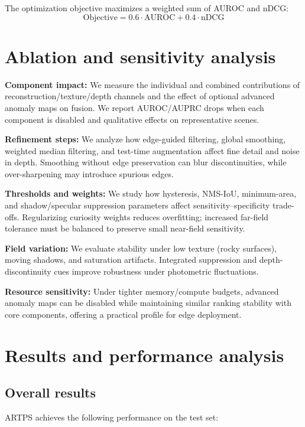 \documentclass[12pt]{article}
\begin{document}
The optimization objective maximizes a weighted sum of AUROC and nDCG:
\[ \text{Objective} = 0.6 \cdot \text{AUROC} + 0.4 \cdot \text{nDCG} \]

\section{Ablation and sensitivity analysis}
\textbf{Component impact:} We measure the individual and combined contributions of reconstruction/texture/depth channels and the effect of optional advanced anomaly maps on fusion. We report AUROC/AUPRC drops when each component is disabled and qualitative effects on representative scenes.

\textbf{Refinement steps:} We analyze how edge-guided filtering, global smoothing, weighted median filtering, and test-time augmentation affect fine detail and noise in depth. Smoothing without edge preservation can blur discontinuities, while over-sharpening may introduce spurious edges.

\textbf{Thresholds and weights:} We study how hysteresis, NMS-IoU, minimum-area, and shadow/specular suppression parameters affect sensitivity--specificity trade-offs. Regularizing curiosity weights reduces overfitting; increased far-field tolerance must be balanced to preserve small near-field sensitivity.

\textbf{Field variation:} We evaluate stability under low texture (rocky surfaces), moving shadows, and saturation artifacts. Integrated suppression and depth-discontinuity cues improve robustness under photometric fluctuations.

\textbf{Resource sensitivity:} Under tighter memory/compute budgets, advanced anomaly maps can be disabled while maintaining similar ranking stability with core components, offering a practical profile for edge deployment.

\section{Results and performance analysis}
\subsection{Overall results}
ARTPS achieves the following performance on the test set:
\end{document}
